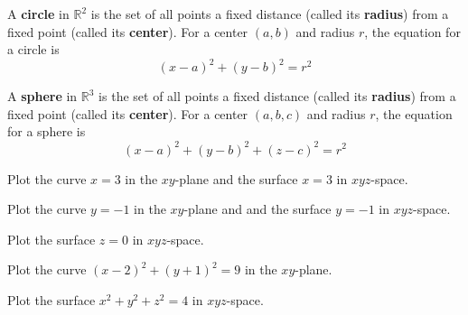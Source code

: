 \documentclass[letterpaper, twoside, 12pt]{book}
\begin{document}
\begin{definition}
  A \textbf{circle} in $\mathbb{R}^2$ is the set of all points a fixed distance
  (called its \textbf{radius}) from a fixed point (called its \textbf{center}).
  For a center $(a,b)$ and radius $r$, the equation for a circle is
  \[
    (x-a)^2+(y-b)^2=r^2
  \]

  A \textbf{sphere} in $\mathbb{R}^3$ is the set of all points a fixed distance
  (called its \textbf{radius}) from a fixed point (called its \textbf{center}).
  For a center $(a,b,c)$ and radius $r$, the equation for a sphere is
  \[
    (x-a)^2+(y-b)^2+(z-c)^2=r^2
  \]
\end{definition}

          \begin{problem}
            Plot the curve $x=3$ in the $xy$-plane and the surface
            $x=3$ in $xyz$-space.
          \end{problem}

          \begin{solution}

          \end{solution}

          \begin{problem}
            Plot the curve $y=-1$ in the $xy$-plane and and the surface
            $y=-1$ in $xyz$-space.
          \end{problem}

          \begin{solution}

          \end{solution}

          \begin{problem}
            Plot the surface $z=0$ in $xyz$-space.
          \end{problem}

          \begin{solution}

          \end{solution}

          \begin{problem}
            Plot the curve $(x-2)^2+(y+1)^2=9$ in the $xy$-plane.
          \end{problem}

          \begin{solution}

          \end{solution}

          \begin{problem}
            Plot the surface $x^2+y^2+z^2=4$ in $xyz$-space.
          \end{problem}
\end{document}
